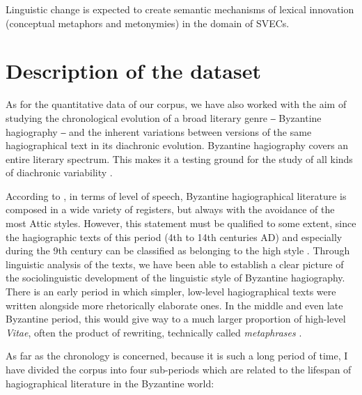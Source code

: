 \documentclass[output=paper,colorlinks,citecolor=brown]{langscibook}
\begin{document}
\z

\z


Linguistic change is expected to create semantic mechanisms of lexical
innovation (conceptual metaphors and metonymies) in the domain of SVECs.

\section{Description of the dataset}\label{sec:vc:3}

As for the quantitative data of our corpus, we have also worked with the aim of studying
the chronological evolution of a broad literary genre ‒ Byzantine hagiography ‒ and the
inherent variations between versions of the same hagiographical text in its diachronic
evolution. Byzantine hagiography covers an entire literary spectrum. This makes it a
testing ground for the study of all kinds of diachronic variability
\parencite{BenteinKlaasJanse2021}.

According to \citet{BenteinKlaas-2013879}, in terms of level of speech, Byzantine
hagiographical literature is composed in a wide variety of registers, but always with the
avoidance of the most Attic styles. However, this statement must be qualified to some
extent, since the hagiographic texts of this period (4th to 14th centuries AD) and especially
during the 9th century can be classified as belonging to the high style
\parencite{SevcenkoIgor-1981832}. Through linguistic analysis of the texts, we have been
able to establish a clear picture of the sociolinguistic development of the linguistic
style of Byzantine hagiography. There is an early period in which simpler, low-level
hagiographical texts were written alongside more rhetorically elaborate ones. In the
middle and even late Byzantine period, this would give way to a much larger proportion of
high-level \emph{Vitae}, often the product of rewriting, technically called
\emph{metaphrases} \parencite{HinterbergerMartin-2010837,HinterbergerMartin-2014621}.

As far as the chronology is concerned, because it is such a long period of time, I have
divided the corpus into four sub-periods which are related to the lifespan of
hagiographical literature in the Byzantine world:
\end{document}
